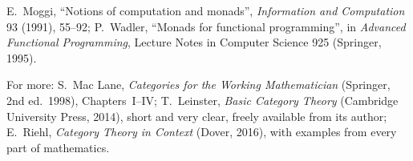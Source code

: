 E.~Moggi, ``Notions of computation and monads'', \emph{Information and Computation} 93 (1991), 55--92; P.~Wadler, ``Monads for functional programming'', in \emph{Advanced Functional Programming}, Lecture Notes in Computer
Science 925 (Springer, 1995).

For more: S.~Mac Lane, \emph{Categories for the Working Mathematician} (Springer, 2nd ed.\ 1998), Chapters~I--IV; T.~Leinster, \emph{Basic Category Theory} (Cambridge University Press, 2014), short and very clear, freely available
from its author; E.~Riehl, \emph{Category Theory in Context} (Dover, 2016), with examples from every part of mathematics.
